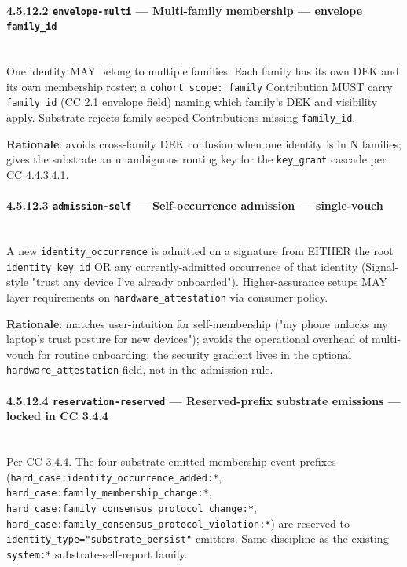 \documentclass[11pt]{article}
\begin{document}
\paragraph{4.5.12.2 \texttt{envelope-multi} — Multi-family membership — envelope \texttt{family\_id}}\mbox{}\\


One identity MAY belong to multiple families. Each family has its own DEK and its own membership roster; a \texttt{cohort\_scope: family} Contribution MUST carry \texttt{family\_id} (CC 2.1 envelope field) naming which family's DEK and visibility apply. Substrate rejects family-scoped Contributions missing \texttt{family\_id}.


\textbf{Rationale}: avoids cross-family DEK confusion when one identity is in N families; gives the substrate an unambiguous routing key for the \texttt{key\_grant} cascade per CC 4.4.3.4.1.


\paragraph{4.5.12.3 \texttt{admission-self} — Self-occurrence admission — single-vouch}\mbox{}\\


A new \texttt{identity\_occurrence} is admitted on a signature from EITHER the root \texttt{identity\_key\_id} OR any currently-admitted occurrence of that identity (Signal-style "trust any device I've already onboarded"). Higher-assurance setups MAY layer requirements on \texttt{hardware\_attestation} via consumer policy.


\textbf{Rationale}: matches user-intuition for self-membership ("my phone unlocks my laptop's trust posture for new devices"); avoids the operational overhead of multi-vouch for routine onboarding; the security gradient lives in the optional \texttt{hardware\_attestation} field, not in the admission rule.


\paragraph{4.5.12.4 \texttt{reservation-reserved} — Reserved-prefix substrate emissions — locked in CC 3.4.4}\mbox{}\\


Per CC 3.4.4. The four substrate-emitted membership-event prefixes (\texttt{hard\_case:identity\_occurrence\_added:*}, \texttt{hard\_case:family\_membership\_change:*}, \texttt{hard\_case:family\_consensus\_protocol\_change:*}, \texttt{hard\_case:family\_consensus\_protocol\_violation:*}) are reserved to \texttt{identity\_type="substrate\_persist"} emitters. Same discipline as the existing \texttt{system:*} substrate-self-report family.
\end{document}
